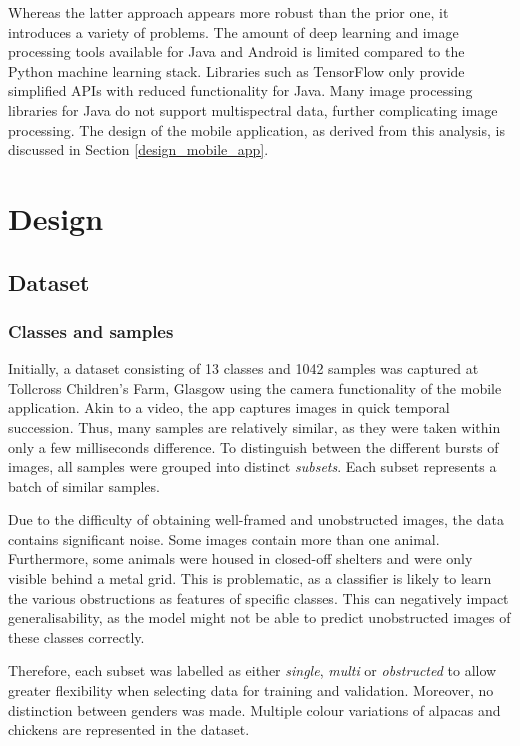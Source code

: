 \documentclass{l4proj}
\begin{document}
Whereas the latter approach appears more robust than the prior one, it introduces a variety of problems. The amount of deep learning and image processing tools available for Java and Android is limited compared to the Python machine learning stack. Libraries such as TensorFlow only provide simplified APIs with reduced functionality for Java. Many image processing libraries for Java do not support multispectral data, further complicating image processing. The design of the mobile application, as derived from this analysis, is discussed in Section \ref{design_mobile_app}.



\chapter{Design}
\label{design}

\section{Dataset}

\subsection{Classes and samples}
\label{classes_samples}

Initially, a dataset consisting of 13 classes and 1042 samples was captured at Tollcross Children's Farm, Glasgow using the camera functionality of the mobile application. Akin to a video, the app captures images in quick temporal succession. Thus, many samples are relatively similar, as they were taken within only a few milliseconds difference. To distinguish between the different bursts of images, all samples were grouped into distinct \textit{subsets}. Each subset represents a batch of similar samples.

Due to the difficulty of obtaining well-framed and unobstructed images, the data contains significant noise. Some images contain more than one animal. Furthermore, some animals were housed in closed-off shelters and were only visible behind a metal grid. This is problematic, as a classifier is likely to learn the various obstructions as features of specific classes. This can negatively impact generalisability, as the model might not be able to predict unobstructed images of these classes correctly.

Therefore, each subset was labelled as either \textit{single}, \textit{multi} or \textit{obstructed} to allow greater flexibility when selecting data for training and validation. Moreover, no distinction between genders was made. Multiple colour variations of alpacas and chickens are represented in the dataset.
\end{document}
